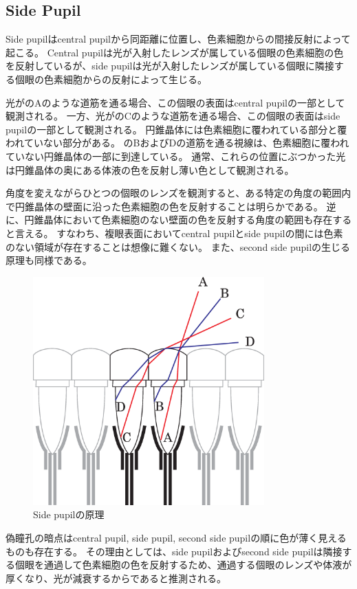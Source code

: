 \subsection{Side Pupil}
\label{SSSidePupil}

Side pupilはcentral pupilから同距離に位置し、色素細胞からの間接反射によって起こる。
Central pupilは光が入射したレンズが属している個眼の色素細胞の色を反射しているが、side pupilは光が入射したレンズが属している個眼に隣接する個眼の色素細胞からの反射によって生じる\cite{}。

光がのAのような道筋を通る場合、この個眼の表面はcentral pupilの一部として観測される。
一方、光がのCのような道筋を通る場合、この個眼の表面はside pupilの一部として観測される。
円錐晶体には色素細胞に覆われている部分と覆われていない部分がある。
のBおよびDの道筋を通る視線は、色素細胞に覆われていない円錐晶体の一部に到達している。
通常、これらの位置にぶつかった光は円錐晶体の奥にある体液の色を反射し薄い色として観測される。

角度を変えながらひとつの個眼のレンズを観測すると、ある特定の角度の範囲内で円錐晶体の壁面に沿った色素細胞の色を反射することは明らかである。
逆に、円錐晶体において色素細胞のない壁面の色を反射する角度の範囲も存在すると言える。
すなわち、複眼表面においてcentral pupilとside pupilの間には色素のない領域が存在することは想像に難くない。
また、second side pupilの生じる原理も同様である。

\begin{figure}[htn]
  \centering
  \includegraphics[width=3.5in]{./img/sidepupil_exp}
  \caption{Side pupilの原理}
  \label{FSidepupilexplanation}
\end{figure}

偽瞳孔の暗点はcentral pupil, side pupil, second side pupilの順に色が薄く見えるものも存在する。
その理由としては、side pupilおよびsecond side pupilは隣接する個眼を通過して色素細胞の色を反射するため、通過する個眼のレンズや体液が厚くなり、光が減衰するからであると推測される。

